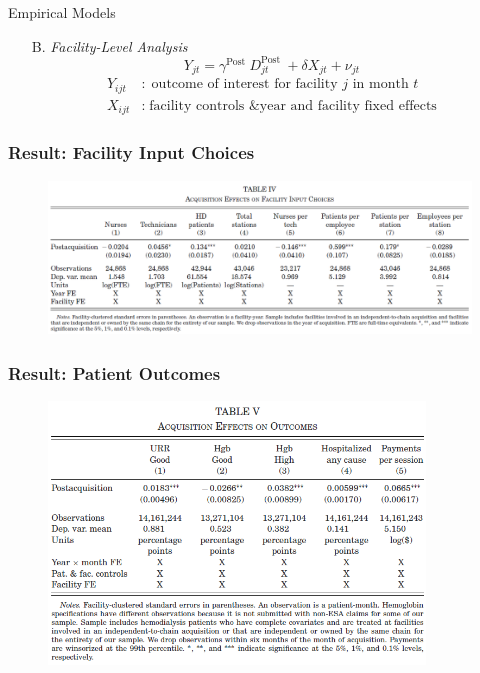 \documentclass[aspectratio=169]{beamer}
\begin{document}
\begin{frame}{Empirical Models}
\begin{itemize}
\item[B.] \textit{Facility-Level Analysis}
\begin{equation}
Y_{j t}=\gamma^{\text {Post }} D_{j t}^{\text {Post }}+\delta X_{j t}+\nu_{j t}
\end{equation}
             \begin{align*}
                Y_{ijt}&: \; \text{outcome of interest for facility $j$ in month $t$}\\
                X_{ijt}&: \; \text{facility controls \& year and facility fixed effects}
            \end{align*}
\end{itemize}

\end{frame}

\begin{frame}\frametitle{Result: Facility Input Choices}
\setlength{\leftmargini}{12pt}
\vspace{-7.5mm}
 \begin{figure}[h!]
        \centering
        \includegraphics[width=140mm]{figure3_2.png}
        \label{fig:method}
        \end{figure}
        \vspace{-9.5mm}

\end{frame}

\begin{frame}\frametitle{Result: Patient Outcomes}
\setlength{\leftmargini}{12pt}
\vspace{-7.5mm}
 \begin{figure}[h!]
        \centering
        \includegraphics[width=100mm]{figure3_3.png}
        \label{fig:method}
        \end{figure}
        \vspace{-9.5mm}

\end{frame}
\end{document}
